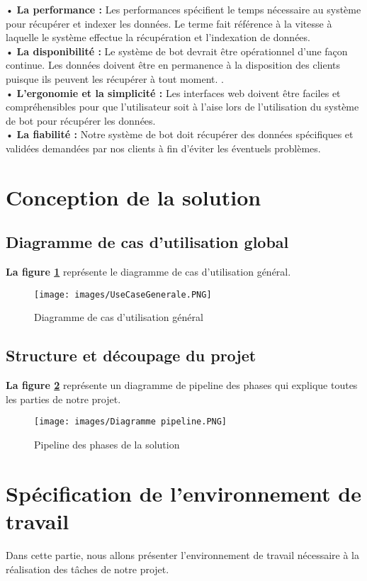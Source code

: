 	•	\textbf{La performance :} Les performances spécifient le temps nécessaire au système pour récupérer et indexer les données. Le terme fait référence à la vitesse à laquelle le système effectue la récupération et l'indexation de données.\\
	
	•	\textbf{La disponibilité :} Le système de bot devrait être opérationnel d'une façon continue. Les données doivent être en permanence à la disposition des clients puisque ils peuvent les récupérer à tout moment. .\\
	
	•	\textbf{L'ergonomie et la simplicité :} Les interfaces web doivent être faciles et compréhensibles pour que l'utilisateur soit à l’aise lors de l’utilisation du système de bot pour récupérer les données.\\
	
	•	\textbf{La fiabilité :} Notre système de bot doit récupérer des données spécifiques et validées demandées par nos clients à fin d’éviter les éventuels problèmes.
	
\section{Conception de la solution}
\subsection{Diagramme de cas d’utilisation global}
\textbf{La figure \ref{fig:usecasediagram-global}} représente le diagramme de cas d’utilisation général.
\begin{figure}[H]
	\centering
	\texttt{[image: images/UseCaseGenerale.PNG]}
	\caption{Diagramme de cas d'utilisation général}
	\label{fig:usecasediagram-global}
\end{figure}
\subsection{Structure et découpage du projet}
\textbf{La figure \ref{fig:pipeline}} représente un diagramme de pipeline des phases qui explique toutes les parties de notre projet. 
\begin{figure}[H]
	\centering
	\texttt{[image: images/Diagramme pipeline.PNG]}
	\caption{Pipeline des phases de la solution}
	\label{fig:pipeline}
\end{figure}
\section{Spécification de l'environnement de travail}
Dans cette partie, nous allons présenter l’environnement de travail nécessaire à la réalisation des tâches de notre projet.


